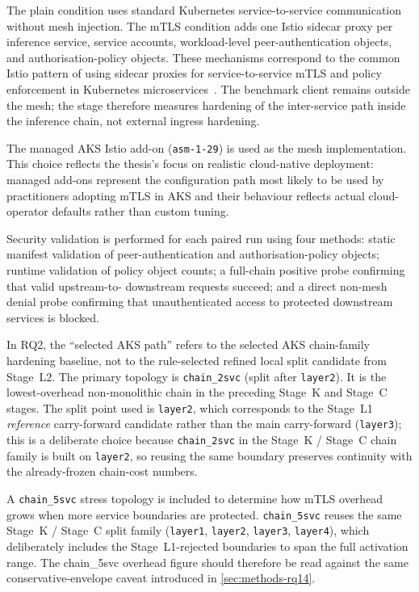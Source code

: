 The plain condition uses standard Kubernetes service-to-service communication without
mesh injection.
The mTLS condition adds one Istio sidecar proxy per inference service, service accounts,
workload-level peer-authentication objects, and authorisation-policy objects.
These mechanisms correspond to the common Istio pattern of using sidecar proxies for
service-to-service mTLS and policy enforcement in Kubernetes
microservices~\cite{ashraf2025policy_workflow}.
The benchmark client remains outside the mesh; the stage therefore measures hardening
of the inter-service path inside the inference chain, not external ingress hardening.

The managed AKS Istio add-on (\texttt{asm-1-29}) is used as the mesh implementation.
This choice reflects the thesis's focus on realistic cloud-native deployment: managed
add-ons represent the configuration path most likely to be used by practitioners
adopting mTLS in AKS and their behaviour reflects actual cloud-operator defaults rather
than custom tuning.

Security validation is performed for each paired run using four methods: static manifest
validation of peer-authentication and authorisation-policy objects; runtime validation
of policy object counts; a full-chain positive probe confirming that valid upstream-to-
downstream requests succeed; and a direct non-mesh denial probe confirming that
unauthenticated access to protected downstream services is blocked.

In RQ2, the ``selected AKS path'' refers to the selected AKS chain-family hardening
baseline, not to the rule-selected refined local split candidate from Stage~L2.
The primary topology is \texttt{chain\_2svc} (split after \texttt{layer2}). It is the
lowest-overhead non-monolithic chain in the preceding Stage~K and Stage~C stages. The split
point used is \texttt{layer2}, which corresponds to the Stage~L1 \emph{reference}
carry-forward candidate rather than the main carry-forward (\texttt{layer3}); this is a
deliberate choice because \texttt{chain\_2svc} in the Stage~K / Stage~C chain family is built
on \texttt{layer2}, so reusing the same boundary preserves continuity with the
already-frozen chain-cost numbers.

A \texttt{chain\_5svc} stress topology is included to determine how mTLS overhead grows
when more service boundaries are protected. \texttt{chain\_5svc} reuses the same Stage~K /
Stage~C split family (\texttt{layer1}, \texttt{layer2}, \texttt{layer3}, \texttt{layer4}),
which deliberately includes the Stage~L1-rejected boundaries to span the full activation
range. The chain\_5svc overhead figure should therefore be read against the same
conservative-envelope caveat introduced in \cref{sec:methods-rq14}.


